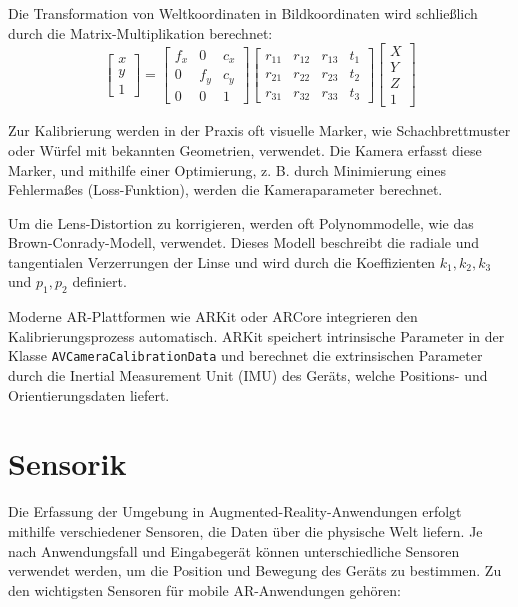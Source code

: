 Die Transformation von Weltkoordinaten in Bildkoordinaten wird schließlich durch die Matrix-Multiplikation berechnet:
\[
\begin{bmatrix}
x \\ y \\ 1
\end{bmatrix}
= 
\begin{bmatrix}
f_x & 0 & c_x \\
0 & f_y & c_y \\
0 & 0 & 1
\end{bmatrix}
\begin{bmatrix}
r_{11} & r_{12} & r_{13} & t_1 \\
r_{21} & r_{22} & r_{23} & t_2 \\
r_{31} & r_{32} & r_{33} & t_3
\end{bmatrix}
\begin{bmatrix}
X \\ Y \\ Z \\ 1
\end{bmatrix}
\]

Zur Kalibrierung werden in der Praxis oft visuelle Marker, wie Schachbrettmuster oder Würfel mit bekannten Geometrien, verwendet. Die Kamera erfasst diese Marker, und mithilfe einer Optimierung, z. B. durch Minimierung eines Fehlermaßes (Loss-Funktion), werden die Kameraparameter berechnet.

Um die Lens-Distortion zu korrigieren, werden oft Polynommodelle, wie das Brown-Conrady-Modell, verwendet. Dieses Modell beschreibt die radiale und tangentialen Verzerrungen der Linse und wird durch die Koeffizienten \( k_1, k_2, k_3 \) und \( p_1, p_2 \) definiert.

Moderne AR-Plattformen wie ARKit oder ARCore integrieren den Kalibrierungsprozess automatisch. ARKit speichert intrinsische Parameter in der Klasse \texttt{AVCameraCalibrationData} und berechnet die extrinsischen Parameter durch die Inertial Measurement Unit (IMU) des Geräts, welche Positions- und Orientierungsdaten liefert.

\section{Sensorik}

Die Erfassung der Umgebung in Augmented-Reality-Anwendungen erfolgt mithilfe verschiedener Sensoren, die Daten über die physische Welt liefern. Je nach Anwendungsfall und Eingabegerät können unterschiedliche Sensoren verwendet werden, um die Position und Bewegung des Geräts zu bestimmen. Zu den wichtigsten Sensoren für mobile AR-Anwendungen gehören:

